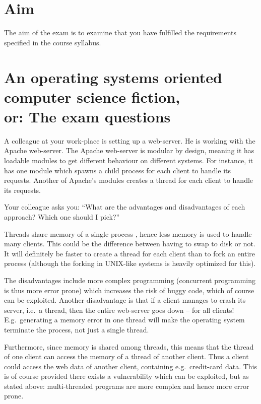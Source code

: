 \documentclass[addpoints,svv]{miunexam}
\begin{document}
\section*{Aim}
\label{sec:Aim}
The aim of the exam is to examine that you have fulfilled the requirements 
specified in the course syllabus.

\clearpage
\section*{An operating systems oriented computer science fiction,\\
  or: The exam questions}

\begin{questions}
  \question[3]\label{q:apache}
  A colleague at your work-place is setting up a web-server.
  He is working with the Apache web-server.
  The Apache web-server is modular by design, meaning it has loadable modules 
  to get different behaviour on different systems.
  For instance, it has one module which spawns a child process for each client 
  to handle its requests.
  Another of Apache's modules creates a thread for each client to handle its 
  requests.

  Your colleague asks you: ``What are the advantages and disadvantages of each 
  approach?  Which one should I pick?''

  \begin{solution}
    Threads share memory of a single process \cite[p.  
    153--154]{Silberschatz2009osc}, hence less memory is used to handle many 
    clients.
    This could be the difference between having to swap to disk or not.
    It will definitely be faster to create a thread for each client than to 
    fork an entire process \cite[p. 154]{Silberschatz2009osc} (although the 
    forking in UNIX-like systems is heavily optimized for this).

    The disadvantages include more complex programming (concurrent programming 
    is thus more error prone) which increases the risk of buggy code, which of 
    course can be exploited.
    Another disadvantage is that if a client manages to crash its server, i.e.\ 
    a thread, then the entire web-server goes down -- for all clients!
    E.g.\ generating a memory error in one thread will make the operating 
    system terminate the process, not just a single thread.

    Furthermore, since memory is shared among threads, this means that the 
    thread of one client can access the memory of a thread of another client.
    Thus a client could access the web data of another client, containing e.g.\ 
    credit-card data.
    This is of course provided there exists a vulnerability which can be 
    exploited, but as stated above: multi-threaded programs are more complex 
    and hence more error prone.
  \end{solution}



\end{questions}
\end{document}
